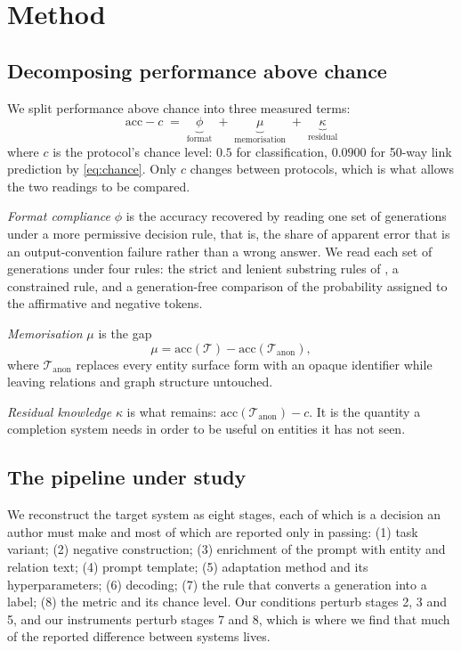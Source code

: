 \documentclass[conference]{IEEEtran}
\begin{document}
\section{Method}
\label{sec:method}

\subsection{Decomposing performance above chance}

We split performance above chance into three measured terms:
\begin{equation}
\label{eq:decomp}
\mathrm{acc}-c \;=\; \underbrace{\phi}_{\text{format}}
\;+\;\underbrace{\mu}_{\text{memorisation}}
\;+\;\underbrace{\kappa}_{\text{residual}}
\end{equation}
where $c$ is the protocol's chance level: $0.5$ for classification, $0.0900$ for
50-way link prediction by \eqref{eq:chance}. Only $c$ changes between protocols,
which is what allows the two readings to be compared.

\emph{Format compliance} $\phi$ is the accuracy recovered by reading one set of
generations under a more permissive decision rule, that is, the share of
apparent error that is an output-convention failure rather than a wrong answer.
We read each set of generations under four rules: the strict and lenient
substring rules of \cite{kgllm}, a constrained rule, and a generation-free
comparison of the probability assigned to the affirmative and negative tokens.

\emph{Memorisation} $\mu$ is the gap
\begin{equation}
\mu = \mathrm{acc}(\mathcal{T}) - \mathrm{acc}(\mathcal{T}_{\text{anon}}),
\end{equation}
where $\mathcal{T}_{\text{anon}}$ replaces every entity surface form with an
opaque identifier while leaving relations and graph structure untouched.

\emph{Residual knowledge} $\kappa$ is what remains: $\mathrm{acc}
(\mathcal{T}_{\text{anon}}) - c$. It is the quantity a completion system needs
in order to be useful on entities it has not seen.

\subsection{The pipeline under study}

We reconstruct the target system as eight stages, each of which is a decision an
author must make and most of which are reported only in passing: (1) task
variant; (2) negative construction; (3) enrichment of the prompt with entity and
relation text; (4) prompt template; (5) adaptation method and its
hyperparameters; (6) decoding; (7) the rule that converts a generation into a
label; (8) the metric and its chance level. Our conditions perturb stages 2, 3
and 5, and our instruments perturb stages 7 and 8, which is where we find that
much of the reported difference between systems lives.
\end{document}
